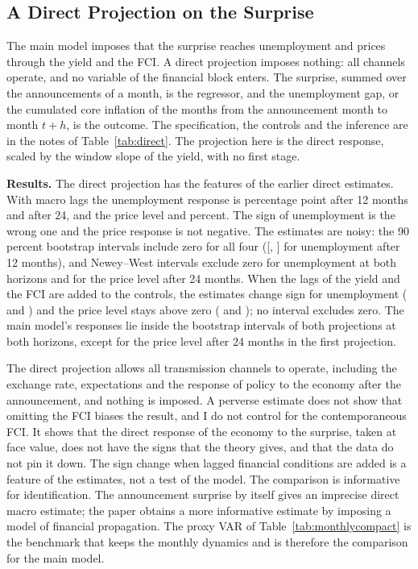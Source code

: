 \documentclass[11pt]{article}
\begin{document}
\begin{appendices}
\FloatBarrier
\section{A Direct Projection on the Surprise}\label{app:direct}
The main model imposes that the surprise reaches unemployment and prices through the yield and the FCI. A direct projection imposes nothing: all channels operate, and no variable of the financial block enters. The surprise, summed over the announcements of a month, is the regressor, and the unemployment gap, or the cumulated core inflation of the months from the announcement month to month $t+h$, is the outcome. The specification, the controls and the inference are in the notes of Table~\ref{tab:direct}. The projection here is the direct response, scaled by the window slope of the yield, with no first stage.

\textbf{Results.} The direct projection has the features of the earlier direct estimates. With macro lags the unemployment response is  percentage point after 12 months and  after 24, and the price level  and  percent. The sign of unemployment is the wrong one and the price response is not negative. The estimates are noisy: the 90 percent bootstrap intervals include zero for all four ([, ] for unemployment after 12 months), and Newey--West intervals exclude zero for unemployment at both horizons and for the price level after 24 months. When the lags of the yield and the FCI are added to the controls, the estimates change sign for unemployment ( and ) and the price level stays above zero ( and ); no interval excludes zero. The main model's responses lie inside the bootstrap intervals of both projections at both horizons, except for the price level after 24 months in the first projection.

The direct projection allows all transmission channels to operate, including the exchange rate, expectations and the response of policy to the economy after the announcement, and nothing is imposed. A perverse estimate does not show that omitting the FCI biases the result, and I do not control for the contemporaneous FCI. It shows that the direct response of the economy to the surprise, taken at face value, does not have the signs that the theory gives, and that the data do not pin it down. The sign change when lagged financial conditions are added is a feature of the estimates, not a test of the model. The comparison is informative for identification. The announcement surprise by itself gives an imprecise direct macro estimate; the paper obtains a more informative estimate by imposing a model of financial propagation. The proxy VAR of Table~\ref{tab:monthlycompact} is the benchmark that keeps the monthly dynamics and is therefore the comparison for the main model.


\end{appendices}
\end{document}
